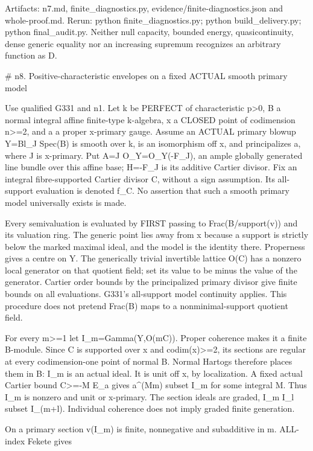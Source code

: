 \documentclass[11pt]{article}
\begin{document}
Artifacts: n7.md, finite\_diagnostics.py, evidence/finite-diagnostics.json and whole-proof.md. Rerun: python finite\_diagnostics.py; python build\_delivery.py; python final\_audit.py. Neither null capacity, bounded energy, quasicontinuity, dense generic equality nor an increasing supremum recognizes an arbitrary function as D.

 \# n8. Positive-characteristic envelopes on a fixed ACTUAL smooth primary model

Use qualified G331 and n1. Let k be PERFECT of characteristic p>0, B a normal integral affine finite-type k-algebra, x a CLOSED point of codimension n>=2, and a a proper x-primary gauge. Assume an ACTUAL primary blowup Y=Bl\_J Spec(B) is smooth over k, is an isomorphism off x, and principalizes a, where J is x-primary. Put A=J O\_Y=O\_Y(-F\_J), an ample globally generated line bundle over this affine base; H=-F\_J is its additive Cartier divisor. Fix an integral fibre-supported Cartier divisor C, without a sign assumption. Its all-support evaluation is denoted f\_C. No assertion that such a smooth primary model universally exists is made.

Every semivaluation is evaluated by FIRST passing to Frac(B/support(v)) and its valuation ring. The generic point lies away from x because a support is strictly below the marked maximal ideal, and the model is the identity there. Properness gives a centre on Y. The generically trivial invertible lattice O(C) has a nonzero local generator on that quotient field; set its value to be minus the value of the generator. Cartier order bounds by the principalized primary divisor give finite bounds on all evaluations. G331's all-support model continuity applies. This procedure does not pretend Frac(B) maps to a nonminimal-support quotient field.

For every m>=1 let I\_m=Gamma(Y,O(mC)). Proper coherence makes it a finite B-module. Since C is supported over x and codim(x)>=2, its sections are regular at every codimension-one point of normal B. Normal Hartogs therefore places them in B: I\_m is an actual ideal. It is unit off x, by localization. A fixed actual Cartier bound C>=-M E\_a gives a\textasciicircum{}(Mm) subset I\_m for some integral M. Thus I\_m is nonzero and unit or x-primary. The section ideals are graded, I\_m I\_l subset I\_(m+l). Individual coherence does not imply graded finite generation.

On a primary section v(I\_m) is finite, nonnegative and subadditive in m. ALL-index Fekete gives
\end{document}
